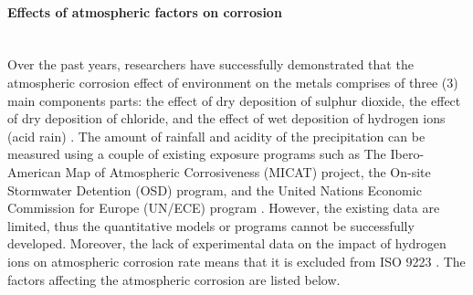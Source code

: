 \paragraph{Effects of atmospheric factors on corrosion} \hfill \\
Over the past years, researchers have successfully demonstrated that the atmospheric corrosion effect of environment on the metals comprises of three (3) main components parts: the effect of dry deposition of sulphur dioxide, the effect of dry deposition of chloride, and the effect of wet deposition of hydrogen ions (acid rain) \cite{cai2018influence}.
The amount of rainfall and acidity of the precipitation can be measured using a couple of existing exposure programs such as The Ibero-American Map of Atmospheric Corrosiveness (MICAT) project, the On-site Stormwater Detention (OSD) program, and the United Nations Economic Commission for Europe (UN/ECE) program \cite{cai2018influence}. However, the existing data are limited, thus the quantitative models or programs cannot be successfully developed. Moreover, the lack of experimental data on the impact of hydrogen ions on atmospheric corrosion rate means that it is excluded from ISO 9223 \cite{protopopoff2011surface}. The factors affecting the atmospheric corrosion are listed below.

